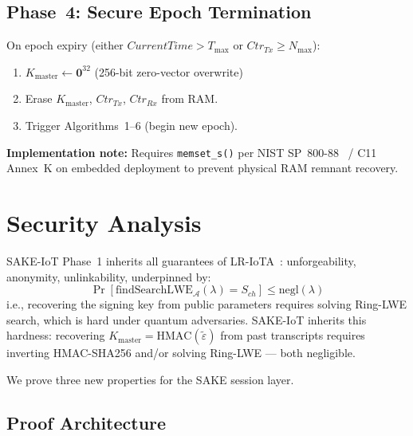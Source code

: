 \documentclass[runningheads]{llncs}
\newcommand{\Kmaster}{K_{\mathrm{master}}}
\newcommand{\Nmax}{N_{\max}}
\newcommand{\Tmax}{T_{\max}}
\begin{document}
\subsection{Phase~4: Secure Epoch Termination}

On epoch expiry (either $\mathit{CurrentTime} > \Tmax$ or $\mathit{Ctr}_{Tx} \geq \Nmax$):
\begin{enumerate}
  \item $\Kmaster \leftarrow \mathbf{0}^{32}$ \quad (256-bit zero-vector overwrite)
  \item Erase $\Kmaster$, $\mathit{Ctr}_{Tx}$, $\mathit{Ctr}_{Rx}$ from RAM.
  \item Trigger Algorithms~1--6 \quad (begin new epoch).
\end{enumerate}
\noindent\textbf{Implementation note:} Requires \texttt{memset\_s()} per NIST
SP~800-88~\cite{nist80088} / C11 Annex~K on embedded deployment to prevent
physical RAM remnant recovery.

\section{Security Analysis}
\label{sec:security}

SAKE-IoT Phase~1 inherits all guarantees of LR-IoTA~\cite{kumari2022}: unforgeability,
anonymity, unlinkability, underpinned by:
\begin{equation}
\Pr[\mathrm{findSearchLWE}_{\mathcal{A}}(\lambda) = S_{ch}] \leq \mathrm{negl}(\lambda)
\end{equation}
i.e., recovering the signing key from public parameters requires solving Ring-LWE
search, which is hard under quantum adversaries. SAKE-IoT inherits this hardness:
recovering $\Kmaster = \mathrm{HMAC}(\tilde{\varepsilon})$ from past transcripts
requires inverting HMAC-SHA256 and/or solving Ring-LWE --- both negligible.

We prove three new properties for the SAKE session layer.

\subsection{Proof Architecture}
\end{document}
